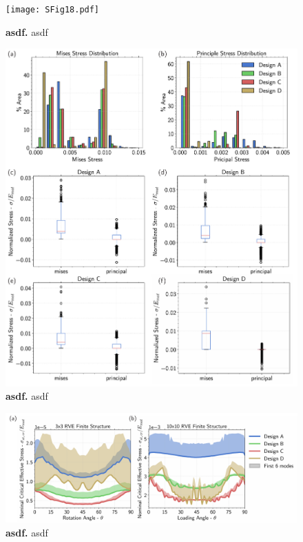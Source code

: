 \documentclass[10pt,twoside]{fernandes_supp}
\begin{document}
\begin{figure}
	\centering
	\texttt{[image: SFig18.pdf]}
	\caption{{\bf asdf.} asdf}
	\label{asdfjgdfsgas}
\end{figure}

\begin{figure}
	\centering
	\includegraphics[width=0.9\linewidth]{SFig19.pdf}
	\caption{{\bf asdf.} asdf}
	\label{asdfgdfjsgas}
\end{figure}

\begin{figure}
	\centering
	\includegraphics[width=0.9\linewidth]{SFig20.pdf}
	\caption{{\bf asdf.} asdf}
	\label{asdfgdfsgas}
\end{figure}
\end{document}
